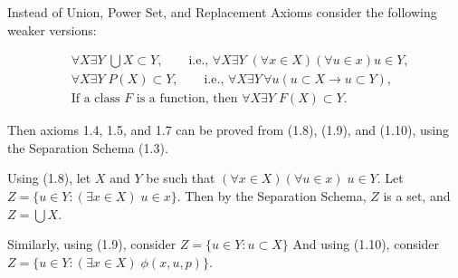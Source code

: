  Instead of Union, Power Set, and Replacement Axioms 
consider the following weaker versions:

\setcounter{chapter}{1}
\setcounter{equation}{7}

\begin{align}
& \forall X \exists Y \; \bigcup X \subset Y, \qquad \text{i.e., } 
  \forall X \exists Y \; (\forall x \in X)(\forall u \in x) u \in Y, \\
& \forall X \exists Y \; P(X) \subset Y, \qquad \text{i.e., } 
  \forall X \exists Y \, \forall u (u \subset X \rightarrow u \subset Y), \\
& \text{If a class } F \text{ is a function, then } 
  \forall X \exists Y \; F(X) \subset Y.
\end{align}

Then axioms 1.4, 1.5, and 1.7 can be proved from (1.8), (1.9), and (1.10), 
using the Separation Schema (1.3).

\begin{solution}
  Using (1.8), let $X$ and $Y$ be such that 
  $( \forall x \in X ) ( \forall u \in x) \; u \in Y$. Let 
  $Z = \{ u \in Y : ( \exists x \in X) \; u \in x \}$. Then by the Separation 
  Schema, $Z$ is a set, and $Z = \bigcup X$.

  Similarly, using (1.9), consider $Z = \{ u \in Y : u \subset X \}$ And using 
  (1.10), consider $Z = \{ u \in Y : (\exists x \in X) \; \phi(x, u, p) \}$.
\end{solution}